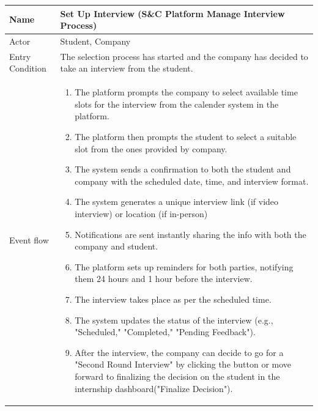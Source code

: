 \begin{table}[H]
    \centering
    \begin{tabular}{|l|p{12cm}|}
    \hline
    Name             & Set Up Interview (S\&C Platform Manage Interview Process) \\ \hline
    Actor            & Student, Company \\ \hline
    Entry Condition  & 
    The selection process has started and the company has decided to take an interview from the student. \\ \hline
    Event flow       & 
    \begin{enumerate}
        \item The platform prompts the company to select available time slots for the interview from the calender system in the platform.
        \item The platform then prompts the student to select a suitable slot from the ones provided by company.
        \item The system sends a confirmation to both the student and company with the scheduled date, time, and interview format.
        \item The system generates a unique interview link (if video interview) or location (if in-person) 
        \item Notifications are sent instantly sharing the info with both the company and student.
        \item The platform sets up reminders for both parties, notifying them 24 hours and 1 hour before the interview.
        \item The interview takes place as per the scheduled time.
        \item The system updates the status of the interview (e.g., "Scheduled," "Completed," "Pending Feedback").
        \item After the interview, the company can decide to go for a "Second Round Interview" by clicking the button or move forward to finalizing the decision on the student in the internship dashboard("Finalize Decision").



\end{enumerate}
\end{tabular}
\end{table}
